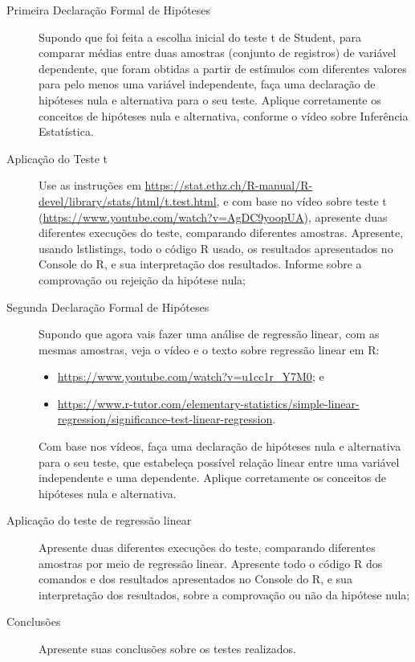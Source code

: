 \begin{enumerate}
\begin{description}
        \item [Primeira Declaração Formal de Hipóteses] Supondo que foi feita a escolha inicial do teste t de Student, para comparar médias entre duas amostras (conjunto de registros) de variável dependente, que foram obtidas a partir de estímulos com diferentes valores para pelo menos uma variável independente, faça uma declaração de hipóteses nula e alternativa para o seu teste. Aplique corretamente os conceitos de hipóteses nula e alternativa, conforme o vídeo sobre Inferência Estatística.
        \item [Aplicação do Teste t] Use as instruções em \url{https://stat.ethz.ch/R-manual/R-devel/library/stats/html/t.test.html}, e com base no vídeo sobre teste t (\url{https://www.youtube.com/watch?v=AgDC9yoopUA}), apresente duas diferentes execuções do teste, comparando diferentes amostras. Apresente, usando lstlistings, todo o código R usado, os resultados apresentados no Console do R, e sua interpretação dos resultados. Informe sobre a comprovação ou rejeição da hipótese nula;
        \item [Segunda Declaração Formal de Hipóteses] Supondo que agora vais fazer uma análise de regressão linear, com as mesmas amostras, veja o vídeo e o texto sobre regressão linear em R:
        \begin{itemize}
            \item \url{https://www.youtube.com/watch?v=u1cc1r_Y7M0}; e
            \item \url{https://www.r-tutor.com/elementary-statistics/simple-linear-regression/significance-test-linear-regression}.
        \end{itemize}
        Com base nos vídeos, faça uma declaração de hipóteses nula e alternativa para o seu teste, que estabeleça possível relação linear entre uma variável independente e uma dependente. Aplique corretamente os conceitos de hipóteses nula e alternativa.
        \item [Aplicação do teste de regressão linear] Apresente duas diferentes execuções do teste, comparando diferentes amostras por meio de regressão linear. Apresente todo o código R dos comandos e dos resultados apresentados no Console do R, e sua interpretação dos resultados, sobre a comprovação ou não da hipótese nula;
        \item [Conclusões] Apresente suas conclusões sobre os testes realizados.
    \end{description}
 \end{enumerate}
    
